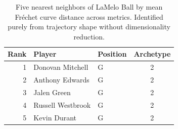 \begin{table}[htbp]
  \centering\small
  \begin{tabular}{rllc}
    \toprule
    Rank & Player & Position & Archetype \\
    \midrule
    1 & Donovan Mitchell & G & 2 \\
    2 & Anthony Edwards & G & 2 \\
    3 & Jalen Green & G & 2 \\
    4 & Russell Westbrook & G & 2 \\
    5 & Kevin Durant & G & 2 \\
    \bottomrule
  \end{tabular}
  \caption{Five nearest neighbors of LaMelo Ball by mean Fr\'{e}chet curve distance across metrics. Identified purely from trajectory shape without dimensionality reduction.}
  \label{tab:LaMelo_Ball_frechet_curve_neighbors}
\end{table}

